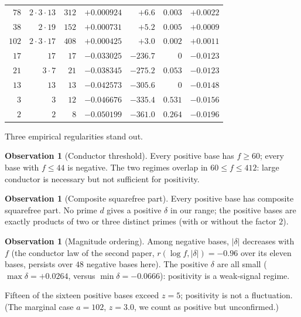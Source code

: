 \documentclass[11pt,reqno]{amsart}
\theoremstyle{plain}
\theoremstyle{definition}
\newtheorem{observation}[theorem]{Observation}
\begin{document}
\begin{table}[t]
\begin{tabular}{rrrrrrr}
$78$  & $2\cdot3\cdot13$  & $312$ & $+0.000924$ & $+6.6$   & $0.003$ & $+0.0022$ \\
$38$  & $2\cdot19$        & $152$ & $+0.000731$ & $+5.2$   & $0.005$ & $+0.0009$ \\
$102$ & $2\cdot3\cdot17$  & $408$ & $+0.000425$ & $+3.0$   & $0.002$ & $+0.0011$ \\
\midrule
$17$  & $17$ & $17$ & $-0.033025$ & $-236.7$ & $0$      & $-0.0123$ \\
$21$  & $3\cdot7$ & $21$ & $-0.038345$ & $-275.2$ & $0.053$ & $-0.0123$ \\
$13$  & $13$ & $13$ & $-0.042573$ & $-305.6$ & $0$      & $-0.0148$ \\
$3$   & $3$  & $12$ & $-0.046676$ & $-335.4$ & $0.531$  & $-0.0156$ \\
$2$   & $2$  & $8$  & $-0.050199$ & $-361.0$ & $0.264$  & $-0.0196$ \\
\bottomrule
\end{tabular}
\end{table}

Three empirical regularities stand out.

\begin{observation}[Conductor threshold]
\label{obs:threshold}
Every positive base has $f \ge 60$; every base with $f \le 44$ is negative.
The two regimes overlap in $60 \le f \le 412$: large conductor is necessary
but not sufficient for positivity.
\end{observation}

\begin{observation}[Composite squarefree part]
\label{obs:composite}
Every positive base has composite squarefree part. No prime $d$ gives a
positive $\delta$ in our range; the positive bases are exactly products of
two or three distinct primes (with or without the factor $2$).
\end{observation}

\begin{observation}[Magnitude ordering]
\label{obs:ordering}
Among negative bases, $|\delta|$ decreases with $f$ (the conductor law of the
second paper, $r(\log f, |\delta|) = -0.96$ over its eleven bases, persists
over $48$ negative bases here). The positive $\delta$ are all small
($\max \delta = +0.0264$, versus $\min \delta = -0.0666$): positivity is a
weak-signal regime.
\end{observation}

Fifteen of the sixteen positive bases exceed $z = 5$; positivity is not a
fluctuation. (The marginal case $a = 102$, $z = 3.0$, we count as positive
but unconfirmed.)
\end{document}
